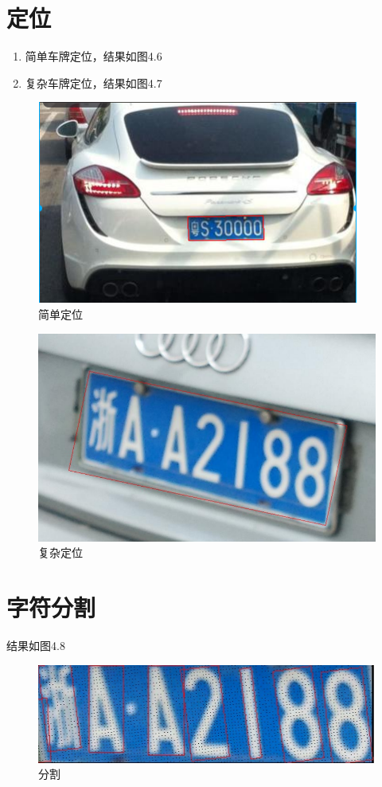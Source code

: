 \section{定位}
\begin{enumerate}
	\item 简单车牌定位，结果如图4.6
	\item 复杂车牌定位，结果如图4.7
\end{enumerate}

\begin{figure}[h]
	\centering
	\includegraphics[scale=0.5]{figures/15.png}
	\caption{简单定位}
	\label{fig:2}
\end{figure}

\begin{figure}[h]
	\centering
	\includegraphics[scale=0.5]{figures/16.png}
	\caption{复杂定位}
	\label{fig:2}
\end{figure}

\section{字符分割}
结果如图4.8
\begin{figure}[h]
	\centering
	\includegraphics[scale=0.5]{figures/17.png}
	\caption{分割}
	\label{fig:2}
\end{figure}